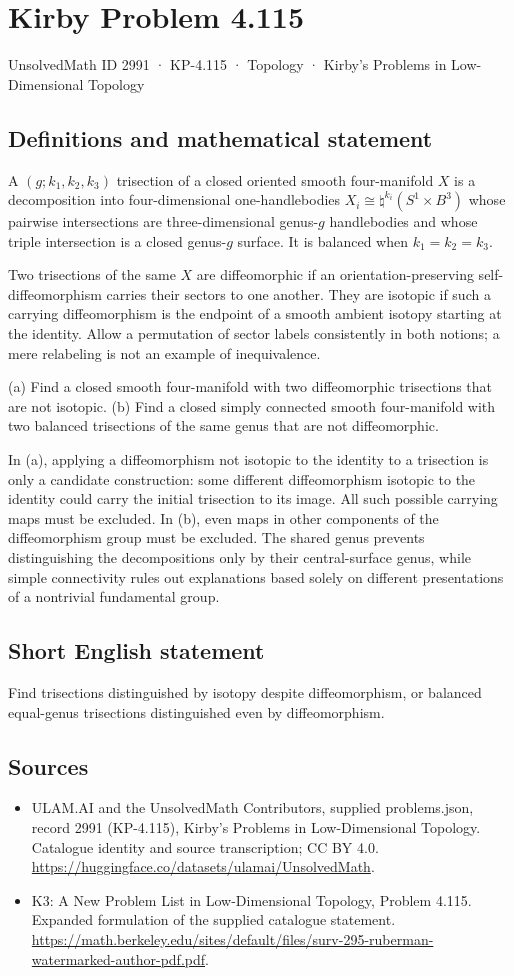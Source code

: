 \documentclass[11pt,a4paper]{article}
\begin{document}
\section*{Kirby Problem 4.115}\label{2991}
{\small UnsolvedMath ID 2991 · KP-4.115 · Topology · Kirby's Problems in Low-Dimensional Topology}
\subsection{Definitions and mathematical statement}
A $(g;k_1,k_2,k_3)$ trisection of a closed oriented smooth four-manifold $X$ is a decomposition into four-dimensional one-handlebodies $X_i\cong\natural^{k_i}(S^1\times B^3)$ whose pairwise intersections are three-dimensional genus-$g$ handlebodies and whose triple intersection is a closed genus-$g$ surface. It is balanced when $k_1=k_2=k_3$.

Two trisections of the same $X$ are diffeomorphic if an orientation-preserving self-diffeomorphism carries their sectors to one another. They are isotopic if such a carrying diffeomorphism is the endpoint of a smooth ambient isotopy starting at the identity. Allow a permutation of sector labels consistently in both notions; a mere relabeling is not an example of inequivalence.

(a) Find a closed smooth four-manifold with two diffeomorphic trisections that are not isotopic. (b) Find a closed simply connected smooth four-manifold with two balanced trisections of the same genus that are not diffeomorphic.

In (a), applying a diffeomorphism not isotopic to the identity to a trisection is only a candidate construction: some different diffeomorphism isotopic to the identity could carry the initial trisection to its image. All such possible carrying maps must be excluded. In (b), even maps in other components of the diffeomorphism group must be excluded. The shared genus prevents distinguishing the decompositions only by their central-surface genus, while simple connectivity rules out explanations based solely on different presentations of a nontrivial fundamental group.
\subsection{Short English statement}
Find trisections distinguished by isotopy despite diffeomorphism, or balanced equal-genus trisections distinguished even by diffeomorphism.
\subsection{Sources}
\begin{itemize}
\item[S1] ULAM.AI and the UnsolvedMath Contributors, supplied problems.json, record 2991 (KP-4.115), Kirby's Problems in Low-Dimensional Topology. Catalogue identity and source transcription; CC BY 4.0.
\url{https://huggingface.co/datasets/ulamai/UnsolvedMath}.
\item[S2] K3: A New Problem List in Low-Dimensional Topology, Problem 4.115. Expanded formulation of the supplied catalogue statement.
\url{https://math.berkeley.edu/sites/default/files/surv-295-ruberman-watermarked-author-pdf.pdf}.
\end{itemize}
\end{document}
